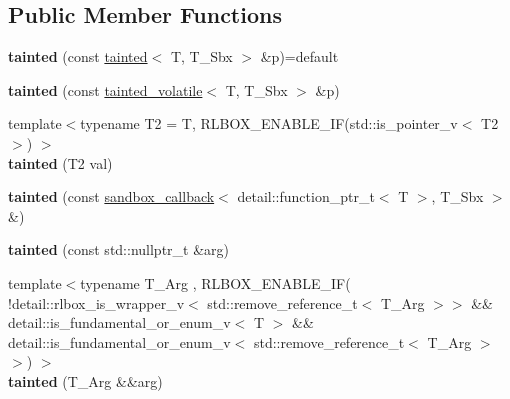 \subsection*{Public Member Functions}
\begin{DoxyCompactItemize}
\item 
\mbox{\label{classrlbox_1_1tainted_a34833410f31fa9a60b663e4b7e2a28fe}} 
{\bfseries tainted} (const \hyperlink{classrlbox_1_1tainted}{tainted}$<$ T, T\+\_\+\+Sbx $>$ \&p)=default
\item 
\mbox{\label{classrlbox_1_1tainted_a7cadc0cd1fb715d719baadb7e2d87042}} 
{\bfseries tainted} (const \hyperlink{classrlbox_1_1tainted__volatile}{tainted\+\_\+volatile}$<$ T, T\+\_\+\+Sbx $>$ \&p)
\item 
\mbox{\label{classrlbox_1_1tainted_a56739db1ff21372093b8180af5778f88}} 
{\footnotesize template$<$typename T2  = T, R\+L\+B\+O\+X\+\_\+\+E\+N\+A\+B\+L\+E\+\_\+\+I\+F(std\+::is\+\_\+pointer\+\_\+v$<$ T2 $>$) $>$ }\\{\bfseries tainted} (T2 val)
\item 
\mbox{\label{classrlbox_1_1tainted_a06c24d3c7b8268ab42e244f45feb31ba}} 
{\bfseries tainted} (const \hyperlink{classrlbox_1_1sandbox__callback}{sandbox\+\_\+callback}$<$ detail\+::function\+\_\+ptr\+\_\+t$<$ T $>$, T\+\_\+\+Sbx $>$ \&)
\item 
\mbox{\label{classrlbox_1_1tainted_a59d4309650ad2e5749cf7847aba8fc48}} 
{\bfseries tainted} (const std\+::nullptr\+\_\+t \&arg)
\item 
\mbox{\label{classrlbox_1_1tainted_a058af0c109aadb7740696f8583310994}} 
{\footnotesize template$<$typename T\+\_\+\+Arg , R\+L\+B\+O\+X\+\_\+\+E\+N\+A\+B\+L\+E\+\_\+\+I\+F( !detail\+::rlbox\+\_\+is\+\_\+wrapper\+\_\+v$<$ std\+::remove\+\_\+reference\+\_\+t$<$ T\+\_\+\+Arg $>$$>$ \&\& detail\+::is\+\_\+fundamental\+\_\+or\+\_\+enum\+\_\+v$<$ T $>$ \&\& detail\+::is\+\_\+fundamental\+\_\+or\+\_\+enum\+\_\+v$<$ std\+::remove\+\_\+reference\+\_\+t$<$ T\+\_\+\+Arg $>$$>$) $>$ }\\{\bfseries tainted} (T\+\_\+\+Arg \&\&arg)
\item 
\mbox{\label{classrlbox_1_1tainted_a27a59dcab0ce6e4aa69be370ce5543fc}} 

\end{DoxyCompactItemize}
